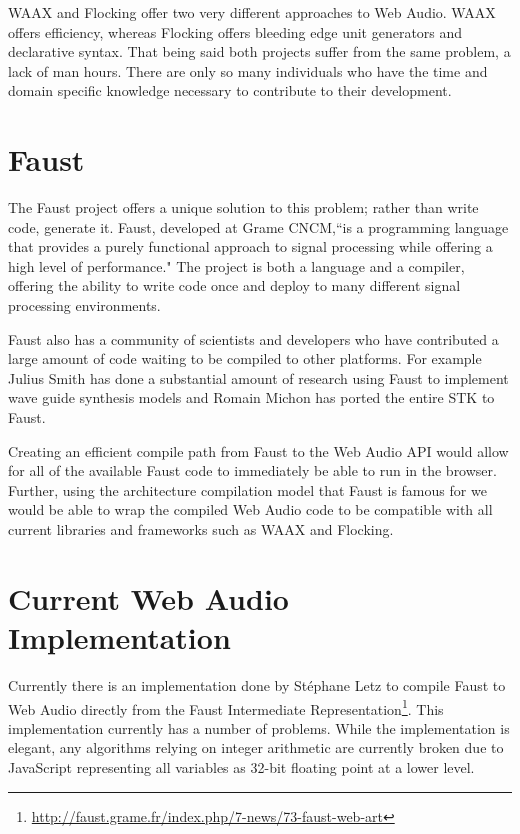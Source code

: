 \documentclass[runningheads,a4paper]{llncs}
\begin{document}
WAAX and Flocking offer two very different approaches to Web Audio. WAAX offers efficiency, whereas Flocking offers bleeding edge unit generators and declarative syntax.  That being said both projects suffer from the same problem, a lack of man hours.  There are only so many individuals who have the time and domain specific knowledge necessary to contribute to their development.

\section{Faust}
The Faust project offers a unique solution to this problem; rather than write code, generate it.  Faust, developed at Grame CNCM,``is a programming language that provides a purely functional approach to signal processing while offering a high level of performance." \cite{orlarey:09c}  The project is both a language and a compiler, offering the ability to write code once and deploy to many different signal processing environments.

Faust also has a community of scientists and developers who have contributed a large amount of code waiting to be compiled to other platforms.  For example Julius Smith has done a substantial amount of research using Faust to implement wave guide synthesis models\cite{Julius:waveguide} and Romain Michon has ported the entire STK to Faust.\cite{Michon:stk}

Creating an efficient compile path from Faust to the Web Audio API would allow for all of the available Faust code to immediately be able to run in the browser. Further, using the architecture compilation model that Faust is famous for we would be able to wrap the compiled Web Audio code to be compatible with all current libraries and frameworks such as WAAX and Flocking.

\section{Current Web Audio Implementation}

Currently there is an implementation done by St\'{e}phane Letz to compile Faust to Web Audio directly from the Faust Intermediate Representation\footnote{\url{http://faust.grame.fr/index.php/7-news/73-faust-web-art}}.  This implementation currently has a number of problems.  While the implementation is elegant, any algorithms relying on integer arithmetic are currently broken due to JavaScript representing all variables as 32-bit floating point at a lower level.
\end{document}
